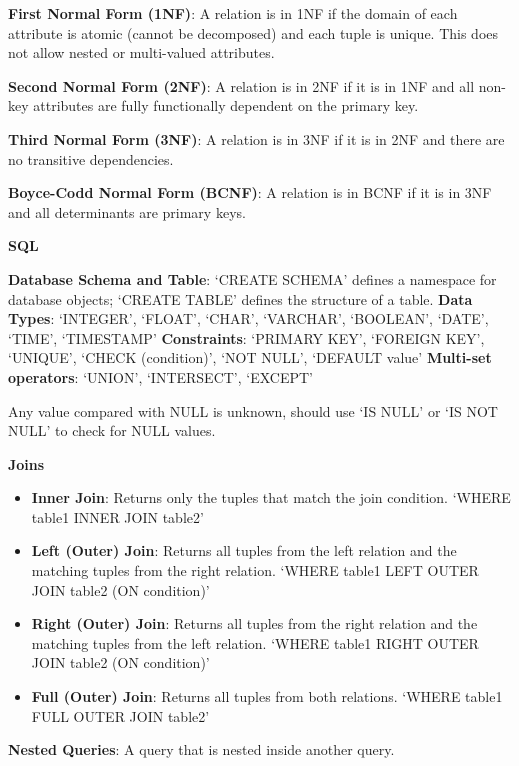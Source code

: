 \documentclass{article}
\begin{document}
\noindent \textbf{First Normal Form (1NF)}: A relation is in 1NF if the domain of each attribute is atomic
(cannot be decomposed) and each tuple is unique. This does not allow nested or multi-valued attributes.

\noindent \textbf{Second Normal Form (2NF)}: A relation is in 2NF if it is in 1NF and all non-key attributes are
fully functionally dependent on the primary key.

\noindent \textbf{Third Normal Form (3NF)}: A relation is in 3NF if it is in 2NF and there are no transitive dependencies.

\noindent \textbf{Boyce-Codd Normal Form (BCNF)}: A relation is in BCNF if it is in 3NF and all determinants are primary keys.

\noindent \textbf{SQL}

\noindent \textbf{Database Schema and Table}: `CREATE SCHEMA' defines a namespace for database objects; `CREATE TABLE' defines the structure of a table.
\noindent \textbf{Data Types}: `INTEGER', `FLOAT', `CHAR', `VARCHAR', `BOOLEAN', `DATE', `TIME', `TIMESTAMP'
\noindent \textbf{Constraints}: `PRIMARY KEY', `FOREIGN KEY', `UNIQUE', `CHECK (condition)', `NOT NULL', `DEFAULT {value}'
\noindent \textbf{Multi-set operators}: `UNION', `INTERSECT', `EXCEPT'

\noindent Any value compared with NULL is unknown, should use `IS NULL' or `IS NOT NULL' to check for NULL values.

\noindent \textbf{Joins}

\begin{itemize}
    \item \textbf{Inner Join}: Returns only the tuples that match the join condition. `WHERE table1 INNER JOIN table2'
    \item \textbf{Left (Outer) Join}: Returns all tuples from the left relation and the matching tuples from the right relation. `WHERE table1 LEFT OUTER JOIN table2 (ON condition)'
    \item \textbf{Right (Outer) Join}: Returns all tuples from the right relation and the matching tuples from the left relation. `WHERE table1 RIGHT OUTER JOIN table2 (ON condition)'
    \item \textbf{Full (Outer) Join}: Returns all tuples from both relations. `WHERE table1 FULL OUTER JOIN table2'
\end{itemize}

\noindent \textbf{Nested Queries}: A query that is nested inside another query.
\end{document}
